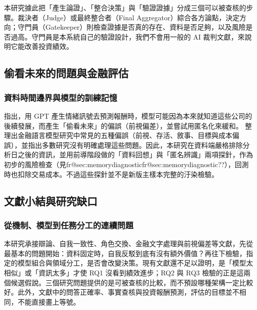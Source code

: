 \documentclass[12pt,a4paper]{article}
\makeatletter
\numberwithin{table}{section}
\numberwithin{figure}{section}
\newcommand{\frref}[1]{\ifcsname fr@#1\endcsname\csname fr@#1\endcsname\else ??\fi}
\makeatother
\begin{document}
本研究據此把「產生論證」、「整合決策」與「驗證證據」分成三個可以被查核的步驟。裁決者（Judge）或最終整合者（Final Aggregator）綜合各方論點，決定方向；守門員（Gatekeeper）則檢查證據是否真的存在、資料是否足夠，以及風險是否過高。守門員是本系統自己的驗證設計，我們不會用一般的 AI 裁判文獻，來說明它能改善投資績效。

\subsection{偷看未來的問題與金融評估}

\subsubsection{資料時間邊界與模型的訓練記憶}
\citet{glasserman2023lookahead} 指出，用 GPT 產生情緒訊號去預測報酬時，模型可能因為本來就知道這些公司的後續發展，而產生「偷看未來」的偏誤（前視偏差），並嘗試用匿名化來緩和。\citet{kong2026bias} 整理出金融語言模型研究中常見的五種偏誤（前視、存活、敘事、目標與成本偏誤），並指出多數研究沒有明確處理這些問題。因此，本研究在資料端嚴格排除分析日之後的資訊，並用前導階段做的「資料回想」與「匿名辨識」兩項探針，作為初步的風險檢查（見\frref{sec:memorydiagnostic}），回測時也扣除交易成本。不過這些探針並不是新版主樣本完整的汙染檢驗。
\subsection{文獻小結與研究缺口}

\subsubsection{從機制、模型到任務分工的連續問題}

本研究承接辯論、自我一致性、角色交換、金融文字處理與前視偏差等文獻，先從最基本的問題開始：資料固定時，自我反駁到底有沒有額外價值？再往下檢驗，指定的模型組合與領域分工，是否會改變決策。現有文獻還不足以證明，是「模型太相似」或「資訊太多」才使 RQ1 沒看到績效進步；RQ2 與 RQ3 檢驗的正是這兩個候選假說。三個研究問題提供的是可被查核的比較，而不預設哪種架構一定比較好。此外，文獻中的問答正確率、事實查核與投資報酬預測，評估的目標並不相同，不能直接畫上等號。
\end{document}
